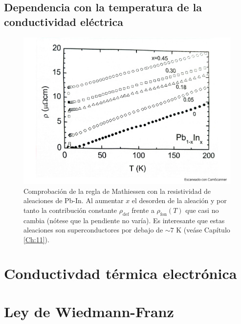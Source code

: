 \subsection{Dependencia con la temperatura de la conductividad eléctrica}
\begin{figure}[h!] \centering
    \includegraphics[scale=0.5]{Cuerpo/Ch_06/Fotos libro 6.pdf}
    \caption{Comprobación de la regla de Mathiessen con la resistividad de aleaciones de Pb-In. Al aumentar $x$ el desorden de la aleación y por tanto la contribución constante $\rho_{\text{def}}$ frente a $\rho_{\text{fon}} (T)$ que casi no cambia (nótese que la pendiente no varía). Es interesante que estas aleaciones son superconductores por debajo de $\sim 7$ K (veáse Capítulo \ref{Ch:11}).}
    \label{Fig:06-06}
\end{figure}  


\section{Conductivdad térmica electrónica}



\section{Ley de Wiedmann-Franz}

